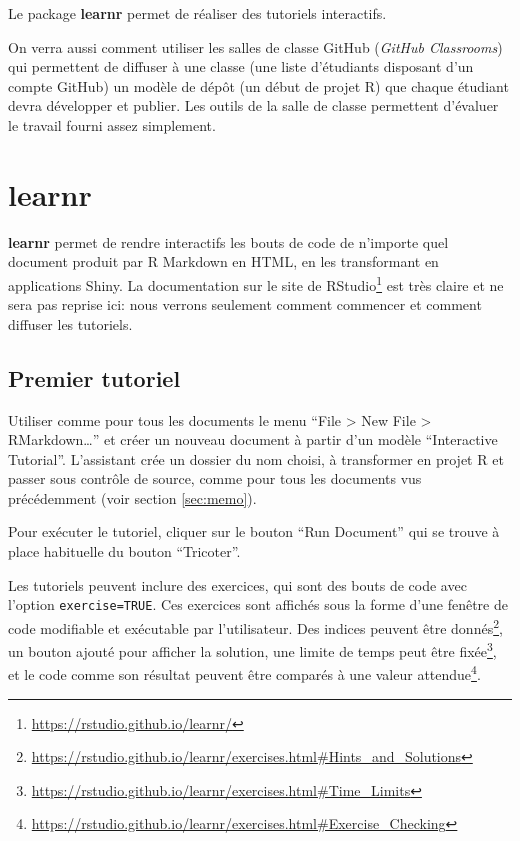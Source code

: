 \documentclass[
  12pt,
  french,
  a4paper,
  extrafontsizes,onecolumn,openright
  ]{memoir}
\begin{document}
Le package \textbf{learnr} permet de réaliser des tutoriels interactifs.

On verra aussi comment utiliser les salles de classe GitHub (\emph{GitHub Classrooms}) qui permettent de diffuser à une classe (une liste d'étudiants disposant d'un compte GitHub) un modèle de dépôt (un début de projet R) que chaque étudiant devra développer et publier.
Les outils de la salle de classe permettent d'évaluer le travail fourni assez simplement.

\hypertarget{learnr}{%
\section{learnr}\label{learnr}}

\textbf{learnr} permet de rendre interactifs les bouts de code de n'importe quel document produit par R Markdown en HTML, en les transformant en applications Shiny.
La documentation sur le site de RStudio\footnote{\url{https://rstudio.github.io/learnr/}} est très claire et ne sera pas reprise ici: nous verrons seulement comment commencer et comment diffuser les tutoriels.

\hypertarget{premier-tutoriel}{%
\subsection{Premier tutoriel}\label{premier-tutoriel}}

Utiliser comme pour tous les documents le menu \enquote{File \textgreater{} New File \textgreater{} RMarkdown\ldots{}} et créer un nouveau document à partir d'un modèle \enquote{Interactive Tutorial}.
L'assistant crée un dossier du nom choisi, à transformer en projet R et passer sous contrôle de source, comme pour tous les documents vus précédemment (voir section \ref{sec:memo}).

Pour exécuter le tutoriel, cliquer sur le bouton \enquote{Run Document} qui se trouve à place habituelle du bouton \enquote{Tricoter}.

Les tutoriels peuvent inclure des exercices, qui sont des bouts de code avec l'option \texttt{exercise=TRUE}.
Ces exercices sont affichés sous la forme d'une fenêtre de code modifiable et exécutable par l'utilisateur.
Des indices peuvent être donnés\footnote{\url{https://rstudio.github.io/learnr/exercises.html\#Hints_and_Solutions}}, un bouton ajouté pour afficher la solution, une limite de temps peut être fixée\footnote{\url{https://rstudio.github.io/learnr/exercises.html\#Time_Limits}}, et le code comme son résultat peuvent être comparés à une valeur attendue\footnote{\url{https://rstudio.github.io/learnr/exercises.html\#Exercise_Checking}}.
\end{document}

